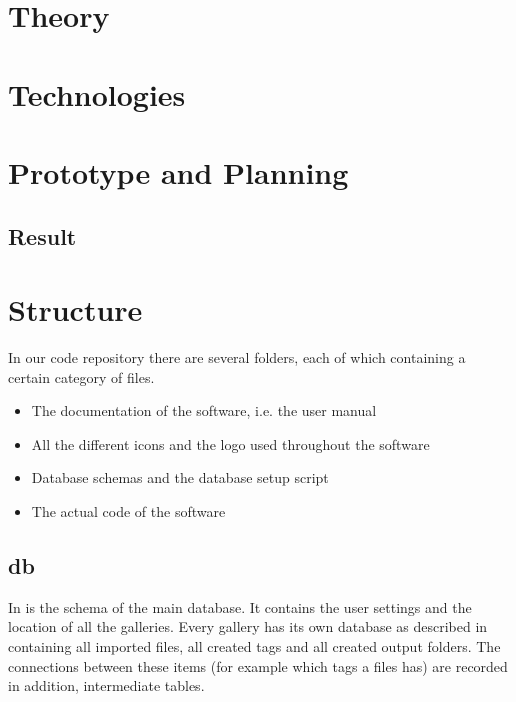 \section{Theory}
\def \kapitelautor {Christoph Führer}

\section{Technologies}
\def \kapitelautor {Christoph Führer}

\section{Prototype and Planning} %
\def \kapitelautor {Erik Ritschl}
\subsection{Result} %

\section{Structure}
\def \kapitelautor {Clemens Stadlbauer}

In our code repository there are several folders, each of which containing a
certain category of files.

\begin{itemize}
	\item[\tfpath{doc/}] The documentation of the software, i.e. the user manual
	\item[\tfpath{icons/}] All the different icons and the logo used throughout the
	software
	\item[\tfpath{db/}] Database schemas and the database setup script
	\item[\tfpath{src/}] The actual code of the software
\end{itemize}

\subsection{db}
In  is the schema of the main database. It contains the user
settings and the location of all the galleries. Every gallery has its own
database as described in  containing all imported files,
all created tags and all created output folders. The connections between these
items (for example which tags a files has) are recorded in addition,
intermediate tables.

